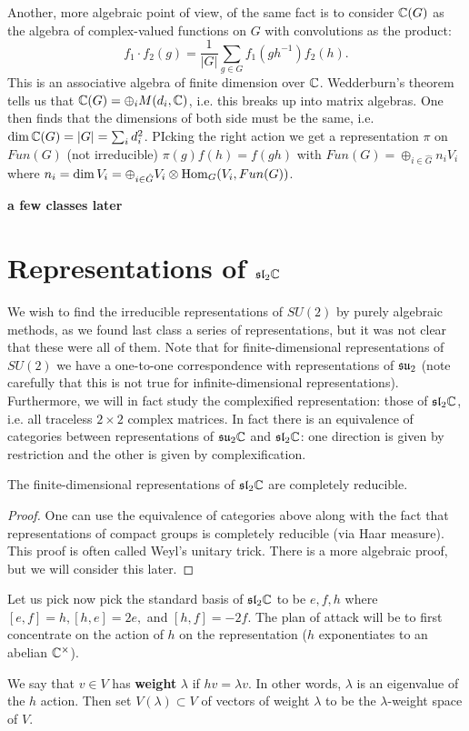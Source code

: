 \documentclass{../mathnotes}
\begin{document}
Another, more algebraic point of view, of the same fact is to consider $\mathbb{C}(G)$ as the algebra of complex-valued functions on $G$ with convolutions
as the product:
\[f_1\cdot f_2(g)=\frac{1}{|G|}\sum_{g\in G}f_1(gh^{-1})f_2(h).\]
This is an associative algebra of finite dimension over $\mathbb{C}$. Wedderburn's theorem tells us that $\mathbb{C}(G)=\oplus_i M(d_i,\mathbb{C})$, i.e. this breaks up
into matrix algebras. One then finds that the dimensions of both side must be the same, i.e. $\dim\mathbb{C}(G)=|G|=\sum_id_i^2$. PIcking the right action
we get a representation $\pi$ on $Fun(G)$ (not irreducible) $\pi(g)f(h)=f(gh)$ with $Fun(G)=\oplus_{i\in\hat G}n_iV_i$ where $n_i=\dim V_i=\oplus_{i\in\hat G}V_i\otimes\operatorname{Hom}_G(V_i,Fun(G))$.



\textbf{a few classes later}

\section{Representations of $\mathfrak{sl}_2\mathbb{C}$}

We wish to find the irreducible representations of $SU(2)$ by purely algebraic methods, as we found last class a series of representations, but it was not clear
that these were all of them. Note that for finite-dimensional representations of $SU(2)$ we have a one-to-one correspondence with representations of $\mathfrak{su}_2$
(note carefully that this is not true for infinite-dimensional representations). Furthermore, we will in fact study the complexified representation: those of $\mathfrak{sl}_2\mathbb{C}$,
i.e. all traceless $2\times 2$ complex matrices. In fact there is an equivalence of categories between representations of $\mathfrak{su}_2\mathbb{C}$ and $\mathfrak{sl}_2\mathbb{C}$: one direction
is given by restriction and the other is given by complexification.

\begin{thm}
    The finite-dimensional representations of $\mathfrak{sl}_2\mathbb{C}$ are completely reducible.
\end{thm}
\begin{proof}
    One can use the equivalence of categories above along with the fact that representations of compact groups is completely reducible (via Haar measure).
    This proof is often called Weyl's unitary trick. There is a more algebraic proof, but we will consider this later.
\end{proof}

Let us pick now pick the standard basis of $\mathfrak{sl}_2\mathbb{C}$ to be $e,f,h$ where $[e,f]=h,[h,e]=2e,$ and $[h,f]=-2f$. The plan of attack will be to first concentrate
on the action of $h$ on the representation ($h$ exponentiates to an abelian $\mathbb{C}^\times$).
\begin{defn}
    We say that $v\in V$ has \textbf{weight} $\lambda$ if $hv=\lambda v$. In other words, $\lambda$ is an eigenvalue of the $h$ action. Then set
    $V(\lambda)\subset V$ of vectors of weight $\lambda$ to be the $\lambda$-weight space of $V$.
\end{defn}
\end{document}
